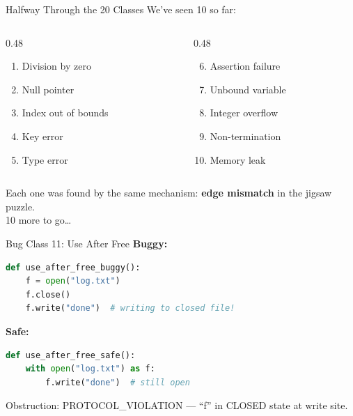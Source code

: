 \documentclass[aspectratio=169,10pt]{beamer}
\newcommand{\warn}[1]{\begin{center}
  \colorbox{warnbg}{\parbox{0.88\textwidth}{\centering\small #1}}\end{center}}
\begin{document}
\begin{frame}{Halfway Through the 20 Classes}
We've seen 10 so far:
\vspace{0.3em}
{\small
\begin{columns}[T]
\begin{column}{0.48\textwidth}
\begin{enumerate}
  \item Division by zero
  \item Null pointer
  \item Index out of bounds
  \item Key error
  \item Type error
\end{enumerate}
\end{column}
\begin{column}{0.48\textwidth}
\begin{enumerate}\setcounter{enumi}{5}
  \item Assertion failure
  \item Unbound variable
  \item Integer overflow
  \item Non-termination
  \item Memory leak
\end{enumerate}
\end{column}
\end{columns}}
\vspace{0.3em}
Each one was found by the same mechanism: \textbf{edge mismatch} in the jigsaw puzzle.\\[0.3em]
10 more to go\ldots
\end{frame}

\begin{frame}[fragile]{Bug Class 11: Use After Free}
\textbf{Buggy:}
\begin{lstlisting}[language=Python, basicstyle=\ttfamily\scriptsize]
def use_after_free_buggy():
    f = open("log.txt")
    f.close()
    f.write("done")  # writing to closed file!
\end{lstlisting}
\textbf{Safe:}
\begin{lstlisting}[language=Python, basicstyle=\ttfamily\scriptsize]
def use_after_free_safe():
    with open("log.txt") as f:
        f.write("done")  # still open
\end{lstlisting}
\warn{Obstruction: PROTOCOL\_VIOLATION --- ``f'' in CLOSED state at write site.}
\end{frame}
\end{document}
